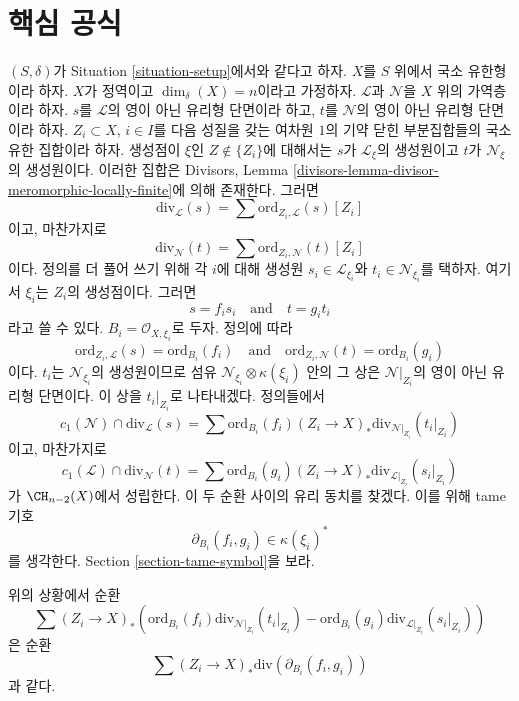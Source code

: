 \section{핵심 공식}
\label{section-key}

\noindent
$(S, \delta)$가 Situation \ref{situation-setup}에서와 같다고 하자.
$X$를 $S$ 위에서 국소 유한형이라 하자. $X$가 정역이고
$\dim_\delta(X) = n$이라고 가정하자. $\mathcal{L}$과 $\mathcal{N}$을
$X$ 위의 가역층이라 하자. $s$를 $\mathcal{L}$의 영이 아닌 유리형
단면이라 하고, $t$를 $\mathcal{N}$의 영이 아닌 유리형 단면이라 하자.
$Z_i \subset X$, $i \in I$를 다음 성질을 갖는 여차원 $1$의 기약 닫힌
부분집합들의 국소 유한 집합이라 하자. 생성점이 $\xi$인
$Z \not \in \{Z_i\}$에 대해서는 $s$가 $\mathcal{L}_\xi$의 생성원이고
$t$가 $\mathcal{N}_\xi$의 생성원이다. 이러한 집합은 Divisors, Lemma
\ref{divisors-lemma-divisor-meromorphic-locally-finite}에 의해 존재한다.
그러면
$$
\text{div}_\mathcal{L}(s) = \sum \text{ord}_{Z_i, \mathcal{L}}(s) [Z_i]
$$
이고, 마찬가지로
$$
\text{div}_\mathcal{N}(t) = \sum \text{ord}_{Z_i, \mathcal{N}}(t) [Z_i]
$$
이다. 정의를 더 풀어 쓰기 위해 각 $i$에 대해 생성원
$s_i \in \mathcal{L}_{\xi_i}$와 $t_i \in \mathcal{N}_{\xi_i}$를 택하자.
여기서 $\xi_i$는 $Z_i$의 생성점이다. 그러면
$$
s = f_i s_i
\quad\text{and}\quad
t = g_i t_i
$$
라고 쓸 수 있다. $B_i = \mathcal{O}_{X, \xi_i}$로 두자. 정의에 따라
$$
\text{ord}_{Z_i, \mathcal{L}}(s) = \text{ord}_{B_i}(f_i)
\quad\text{and}\quad
\text{ord}_{Z_i, \mathcal{N}}(t) = \text{ord}_{B_i}(g_i)
$$
이다. $t_i$는 $\mathcal{N}_{\xi_i}$의 생성원이므로 섬유
$\mathcal{N}_{\xi_i} \otimes \kappa(\xi_i)$ 안의 그 상은
$\mathcal{N}|_{Z_i}$의 영이 아닌 유리형 단면이다. 이 상을
$t_i|_{Z_i}$로 나타내겠다. 정의들에서
$$
c_1(\mathcal{N}) \cap \text{div}_\mathcal{L}(s) =
\sum \text{ord}_{B_i}(f_i)
(Z_i \to X)_*\text{div}_{\mathcal{N}|_{Z_i}}(t_i|_{Z_i})
$$
이고, 마찬가지로
$$
c_1(\mathcal{L}) \cap \text{div}_\mathcal{N}(t) =
\sum \text{ord}_{B_i}(g_i)
(Z_i \to X)_*\text{div}_{\mathcal{L}|_{Z_i}}(s_i|_{Z_i})
$$
가 $\CH_{n - 2}(X)$에서 성립한다. 이 두 순환 사이의 유리 동치를
찾겠다. 이를 위해 tame 기호
$$
\partial_{B_i}(f_i, g_i) \in \kappa(\xi_i)^*
$$
를 생각한다. Section \ref{section-tame-symbol}을 보라.

\begin{lemma}[핵심 공식]
\label{lemma-key-formula}
위의 상황에서 순환
$$
\sum
(Z_i \to X)_*\left(
\text{ord}_{B_i}(f_i) \text{div}_{\mathcal{N}|_{Z_i}}(t_i|_{Z_i}) -
\text{ord}_{B_i}(g_i) \text{div}_{\mathcal{L}|_{Z_i}}(s_i|_{Z_i}) \right)
$$
은 순환
$$
\sum (Z_i \to X)_*\text{div}(\partial_{B_i}(f_i, g_i))
$$
과 같다.
\end{lemma}


